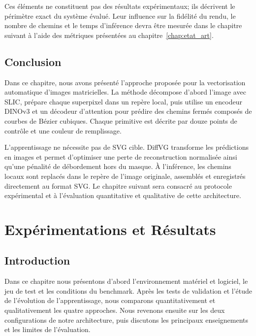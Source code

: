 \documentclass[12pt, a4paper, oneside]{report}
\begin{document}
Ces éléments ne constituent pas des résultats expérimentaux; ils décrivent le périmètre exact du système évalué. Leur influence sur la fidélité du rendu, le nombre de chemins et le temps d'inférence devra être mesurée dans le chapitre suivant à l'aide des métriques présentées au chapitre~\ref{chap:etat_art}.

\section{Conclusion}

Dans ce chapitre, nous avons présenté l'approche proposée pour la vectorisation automatique d'images matricielles. La méthode décompose d'abord l'image avec SLIC, prépare chaque superpixel dans un repère local, puis utilise un encodeur DINOv3 et un décodeur d'attention pour prédire des chemins fermés composés de courbes de Bézier cubiques. Chaque primitive est décrite par douze points de contrôle et une couleur de remplissage.

L'apprentissage ne nécessite pas de SVG cible. DiffVG transforme les prédictions en images et permet d'optimiser une perte de reconstruction normalisée ainsi qu'une pénalité de débordement hors du masque. À l'inférence, les chemins locaux sont replacés dans le repère de l'image originale, assemblés et enregistrés directement au format SVG. Le chapitre suivant sera consacré au protocole expérimental et à l'évaluation quantitative et qualitative de cette architecture.


\chapter{Expérimentations et Résultats}
\label{chap:experimentations_resultats}

\section{Introduction}

Dans ce chapitre nous présentons d'abord l'environnement matériel et logiciel, le jeu de test et les conditions du benchmark. Après les tests de validation et l'étude de l'évolution de l'apprentissage, nous comparons quantitativement et qualitativement les quatre approches. Nous revenons ensuite sur les deux configurations de notre architecture, puis discutons les principaux enseignements et les limites de l'évaluation.
\end{document}
